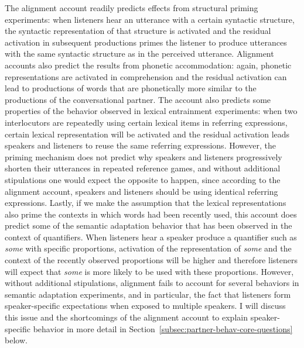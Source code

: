 The alignment account readily predicts effects from structural priming experiments: when listeners hear an utterance with a certain syntactic structure,
the syntactic representation of that structure is activated and the residual activation in subsequent productions primes the listener to produce utterances
with the same syntactic structure as in the perceived utterance. Alignment accounts also predict the results from phonetic accommodation: again,
phonetic representations are activated in comprehension and the residual activation can lead to productions of words that are phonetically more similar to the
productions of the conversational partner. The account also predicts some properties of the behavior observed in lexical entrainment experiments: 
when two interlocutors are repeatedly using certain lexical items in referring expressions, certain lexical representation will be activated and the residual
activation leads speakers and listeners to reuse the same referring expressions. However, the priming mechanism does not predict why speakers and listeners 
progressively shorten their utterances in repeated reference games, and without additional stipulations one would expect the opposite to happen, since according
to the alignment account, speakers and listeners should be using identical referring expressions. Lastly, if we make the assumption that the lexical representations
also prime the contexts in which words had been recently used, this account does predict some of the semantic adaptation behavior that has been observed in the 
context of quantifiers. When listeners hear a speaker produce a quantifier such as \textit{some} with specific proportions, activation of the representation of \textit{some} and the 
context of the recently observed proportions will be higher and therefore listeners will expect that \textit{some} is more likely to be used with these proportions. However,
without additional stipulations, alignment fails to account for several behaviors in semantic adaptation experiments, and in particular, the fact that listeners form speaker-specific
expectations when exposed to multiple speakers. I will discuss this issue and the shortcomings of the 
alignment account to explain speaker-specific behavior in more detail in Section~\ref{subsec:partner-behav-core-questions} below.







